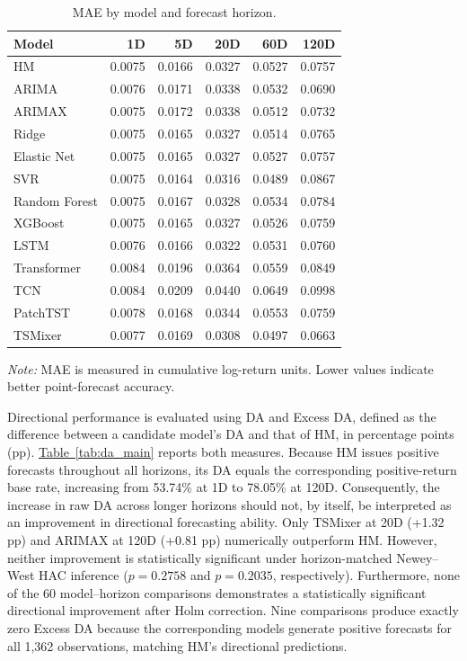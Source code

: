 \documentclass[12pt,twoside]{ord}
\begin{document}
\begin{table}[htbp]
\centering
\caption{MAE by model and forecast horizon.}\label{tab:mae_main}
\setlength{\tabcolsep}{4.5pt}
\begin{tabular}{lrrrrr}
\hline
Model & 1D & 5D & 20D & 60D & 120D \\
\hline
HM & 0.0075 & 0.0166 & 0.0327 & 0.0527 & 0.0757 \\
ARIMA & 0.0076 & 0.0171 & 0.0338 & 0.0532 & 0.0690 \\
ARIMAX & 0.0075 & 0.0172 & 0.0338 & 0.0512 & 0.0732 \\
Ridge & 0.0075 & 0.0165 & 0.0327 & 0.0514 & 0.0765 \\
Elastic Net & 0.0075 & 0.0165 & 0.0327 & 0.0527 & 0.0757 \\
SVR & 0.0075 & 0.0164 & 0.0316 & 0.0489 & 0.0867 \\
Random Forest & 0.0075 & 0.0167 & 0.0328 & 0.0534 & 0.0784 \\
XGBoost & 0.0075 & 0.0165 & 0.0327 & 0.0526 & 0.0759 \\
LSTM & 0.0076 & 0.0166 & 0.0322 & 0.0531 & 0.0760 \\
Transformer & 0.0084 & 0.0196 & 0.0364 & 0.0559 & 0.0849 \\
TCN & 0.0084 & 0.0209 & 0.0440 & 0.0649 & 0.0998 \\
PatchTST & 0.0078 & 0.0168 & 0.0344 & 0.0553 & 0.0759 \\
TSMixer & 0.0077 & 0.0169 & 0.0308 & 0.0497 & 0.0663 \\
\hline
\end{tabular}
\par\vspace{4pt}\parbox{0.85\linewidth}{\fontsize{9pt}{12pt}\selectfont\textit{Note:} MAE is measured in cumulative log-return units. Lower values indicate better point-forecast accuracy.}
\end{table}

Directional performance is evaluated using DA and Excess DA, defined as the difference between a candidate model's DA and that of HM, in percentage points (pp). \hyperref[tab:da_main]{Table~\ref*{tab:da_main}} reports both measures. Because HM issues positive forecasts throughout all horizons, its DA equals the corresponding positive-return base rate, increasing from 53.74\% at 1D to 78.05\% at 120D. Consequently, the increase in raw DA across longer horizons should not, by itself, be interpreted as an improvement in directional forecasting ability. Only TSMixer at 20D (+1.32 pp) and ARIMAX at 120D (+0.81 pp) numerically outperform HM. However, neither improvement is statistically significant under horizon-matched Newey--West HAC inference ($p=0.2758$ and $p=0.2035$, respectively). Furthermore, none of the 60 model--horizon comparisons demonstrates a statistically significant directional improvement after Holm correction. Nine comparisons produce exactly zero Excess DA because the corresponding models generate positive forecasts for all 1,362 observations, matching HM's directional predictions.
\end{document}
